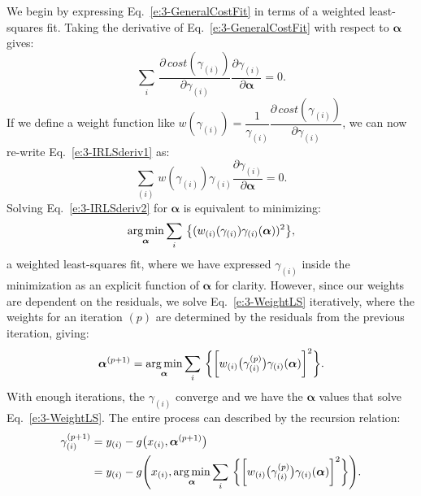 We begin by expressing Eq.~\ref{e:3-GeneralCostFit} in terms of a weighted least-squares fit.
Taking the derivative of Eq.~\ref{e:3-GeneralCostFit} with respect to $\bm{\alpha}$ gives:
\begin{equation}
  \sum\limits_i\,\frac{\partial \, \mathit{cost}(\gamma_{(i)})}{\partial \gamma_{(i)}} \frac{\partial \gamma_{(i)}}{\partial \bm{\alpha}} = 0.\label{e:3-IRLSderiv1}
\end{equation}
If we define a weight function like $w(\gamma_{(i)}) = \dfrac{1}{\gamma_{(i)}}\dfrac{\partial \, \mathit{cost}(\gamma_{(i)})}{\partial \gamma_{(i)}}$, we can now re-write Eq.~\ref{e:3-IRLSderiv1} as:
\begin{equation}
  \sum\limits_{(i)}\,w(\gamma_{(i)}) \gamma_{(i)} \frac{\partial \gamma_{(i)}}{\partial \bm{\alpha}} = 0.\label{e:3-IRLSderiv2}
\end{equation}
 Solving Eq.~\ref{e:3-IRLSderiv2} for $\bm{\alpha}$ is equivalent to minimizing:
 \begin{equation}
   \operatorname*{arg\,min}_{\bm{\alpha}} \sum\limits_i\,\big \{ (w_{(i)}(\gamma_{(i)}) \gamma_{(i)}(\bm{\alpha}))^2 \big \},\label{e:3-WeightLS}
 \end{equation}
a weighted least-squares fit, where we have expressed $\gamma_{(i)}$ inside the minimization as an explicit function of $\bm{\alpha}$ for clarity.
However, since our weights are dependent on the residuals, we solve Eq.~\ref{e:3-WeightLS} iteratively, where the weights for an iteration $(p)$ are determined by the residuals from the previous iteration, giving:
\begin{equation}
  \bm{\alpha}^{(p+1)} = \operatorname*{arg\,min}_{\bm{\alpha}} \sum\limits_i\,\bigg \{ \bigg [w_{(i)} \big(\gamma_{(i)}^{(p)}\big ) \gamma_{(i)}(\bm{\alpha}) \bigg ]^2 \bigg \}.
\end{equation}
With enough iterations, the $\gamma_{(i)}$ converge and we have the $\bm{\alpha}$ values that solve Eq.~\ref{e:3-WeightLS}.
The entire process can described by the recursion relation:
\begin{align}
  \gamma_{(i)}^{(p+1)}
  &= y_{(i)} - g\big (x_{(i)},\bm{\alpha}^{(p+1)}\big ) \nonumber \\
  &= y_{(i)} - g\Bigg (x_{(i)}, \operatorname*{arg\,min}_{\bm{\alpha}} \sum\limits_i\,\bigg \{ \bigg [w_{(i)} \big(\gamma_{(i)}^{(p)}\big ) \gamma_{(i)}(\bm{\alpha}) \bigg ]^2 \bigg \} \Bigg).
\end{align}

